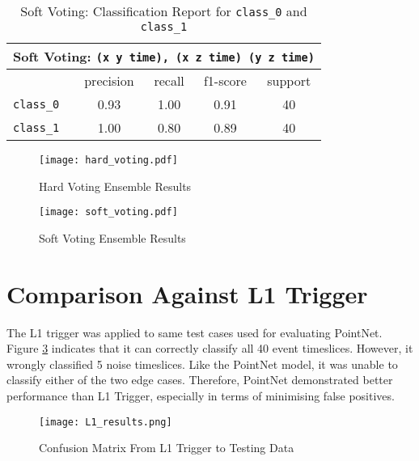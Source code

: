 \begin{table} [ht!]
    \centering
    \begin{tabular}{l c c c c}
    \hline
    \multicolumn{5}{c}{Soft Voting: \texttt{(x y time), (x z time) (y z time)}} \\
    \hline
                     & precision & recall & f1-score & support \\
        \texttt{class\_0} & 0.93 &  1.00    & 0.91 & 40\\
        \texttt{class\_1} & 1.00 &  0.80    & 0.89 & 40\\
    \hline
    \end{tabular}
    \caption{Soft Voting: Classification Report for \texttt{class\_0} and \texttt{class\_1}}
    \label{tab:soft_classification_report}
\end{table}


\begin{figure}[ht!]
    \centering
    \texttt{[image: hard\_voting.pdf]}
    \caption{Hard Voting Ensemble Results}
    \label{fig:hard_plots}
\end{figure}



\begin{figure}[ht!]
    \centering
    \texttt{[image: soft\_voting.pdf]}
    \caption{Soft Voting Ensemble Results}
    \label{fig:soft_plots}
\end{figure}

\section{Comparison Against L1 Trigger}
The L1 trigger was applied to same test cases used for evaluating PointNet. Figure \ref{fig:l1} indicates that it can correctly classify all 40 event timeslices. However, it wrongly classified 5 noise timeslices. Like the PointNet model, it was unable to classify either of the two edge cases. Therefore, PointNet demonstrated better performance than L1 Trigger, especially in terms of minimising false positives. 

\begin{figure}[ht!]
    \centering
    \texttt{[image: L1\_results.png]}
    \caption{Confusion Matrix From L1 Trigger to Testing Data}
    \label{fig:l1}
\end{figure}


